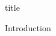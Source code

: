 \documentclass{article}
\begin{document}
{title}

\frontmatter

\tableofcontents

\listoffigures
\listoftables

\mainmatter

{Introduction}

\newpage
\printbibliography[heading = bibintoc]    %

\end{document}
